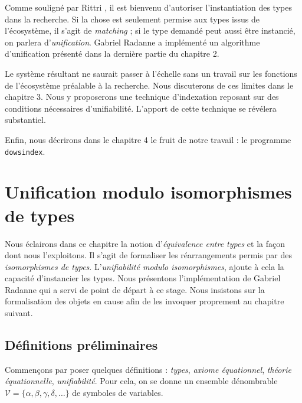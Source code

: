\documentclass[a4paper]{report}
\theoremstyle{definition}
\newcommand{\dowsindex}{\texttt{dowsindex}\xspace}
\newcommand{\V}{\mathscr{V}}
\begin{document}
Comme souligné par Rittri \cite{Rittri93}, il est bienvenu d'autoriser l'instantiation des types dans la recherche. Si la chose est seulement permise aux types issus de l'écosystème, il s'agit de \emph{matching} ; si le type demandé peut aussi être instancié, on parlera d'\emph{unification}. Gabriel Radanne a implémenté un algorithme d'unification présenté dans la dernière partie du chapitre 2.

Le système résultant ne saurait passer à l'échelle sans un travail sur les fonctions de l'écosystème préalable à la recherche. Nous discuterons de ces limites dans le chapitre 3. Nous y proposerons une technique d'indexation reposant sur des conditions nécessaires d'unifiabilité. L'apport de cette technique se révélera substantiel.

Enfin, nous décrirons dans le chapitre 4 le fruit de notre travail : le programme \dowsindex.


\chapter{Unification modulo isomorphismes de types}

Nous éclairons dans ce chapitre la notion d'\emph{équivalence entre types} et la façon dont nous l'exploitons. Il s'agit de formaliser les réarrangements permis par des \emph{isomorphismes de types}. L'\emph{unifiabilité modulo isomorphismes}, ajoute à cela la capacité d'instancier les types. Nous présentons l'implémentation de Gabriel Radanne qui a servi de point de départ à ce stage. Nous insistons sur la formalisation des objets en cause afin de les invoquer proprement au chapitre suivant.


\section{Définitions préliminaires}

Commençons par poser quelques définitions : \emph{types}, \emph{axiome équationnel}, \emph{théorie équationnelle}, \emph{unifiabilité}. Pour cela, on se donne un ensemble dénombrable $\V = \{ \alpha, \beta, \gamma, \delta, \dots \}$ de symboles de variables.
\end{document}
